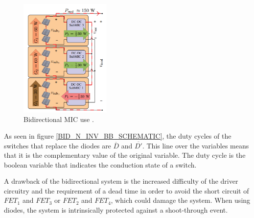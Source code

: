 \begin{figure}[H]
	\begin{center}
		\includegraphics[width=0.4\textwidth]{../Pictures/bidirectional_mic_use}
		\caption{Bidirectional MIC use \cite{ArchitectureMIC}.}
		\label{BID_MIC_ARCHITECTURES}
	\end{center}	
\end{figure}
		
As seen in figure \ref{BID_N_INV_BB_SCHEMATIC}, the duty cycles of the switches that replace the diodes are $\overline{D}$ and $\overline{D'}$. This line over the variables means that it is the complementary value of the original variable. The duty cycle is the boolean variable that indicates the conduction state of a switch. 
		
A drawback of the bidirectional system is the increased difficulty of the driver circuitry and the requirement of a dead time in order to avoid the short circuit of $FET_1$ and $FET_3$ or $FET_2$ and $FET_4$, which could damage the system. When using diodes, the system is intrinsically protected against a shoot-through event.
		

